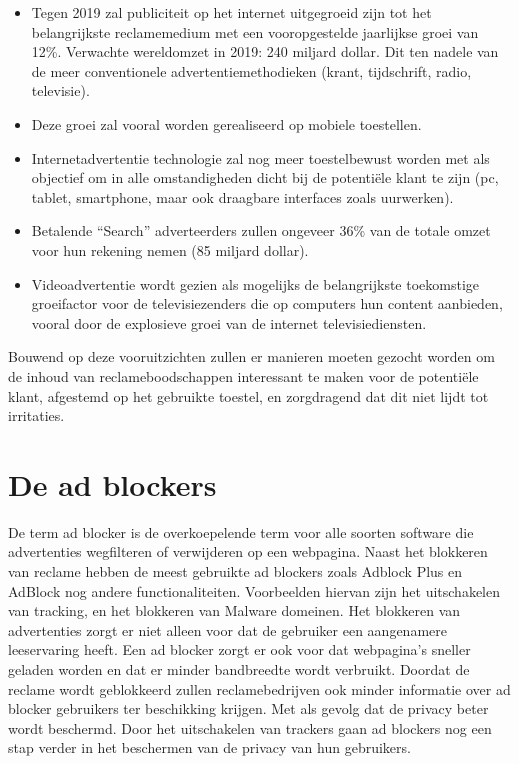 \documentclass[pdftex,a4paper,12pt,twoside]{report}
\begin{document}
\begin{itemize}
	\item 	Tegen 2019 zal publiciteit op het internet uitgegroeid zijn tot het belangrijkste reclamemedium met een vooropgestelde jaarlijkse groei van 12\%. Verwachte wereldomzet in 2019: 240 miljard dollar. Dit ten nadele van de meer conventionele advertentiemethodieken (krant, tijdschrift, radio, televisie).
	
	\item	Deze groei zal vooral worden gerealiseerd op mobiele toestellen.
	\item	Internetadvertentie technologie zal nog meer toestelbewust worden met als objectief om in alle omstandigheden dicht bij de potentiële klant te zijn (pc, tablet, smartphone, maar ook draagbare interfaces zoals uurwerken).
	\item	Betalende “Search” adverteerders zullen ongeveer 36\% van de totale omzet voor hun rekening nemen (85 miljard dollar).
	\item	Videoadvertentie wordt gezien als mogelijks de belangrijkste toekomstige groeifactor voor de televisiezenders die op computers hun content aanbieden, vooral door de explosieve groei van de internet televisiediensten.
\end{itemize}
Bouwend op deze vooruitzichten zullen er manieren moeten gezocht worden om de inhoud van reclameboodschappen interessant te maken voor de potentiële klant, afgestemd op het gebruikte toestel, en zorgdragend dat dit niet lijdt tot irritaties. 

\chapter{De ad blockers}
\label{ch:De Ad blockers}
De term ad blocker is de overkoepelende term voor alle soorten software die advertenties wegfilteren of verwijderen op een webpagina. Naast het blokkeren van reclame hebben de meest gebruikte ad blockers zoals Adblock Plus en AdBlock nog andere functionaliteiten. Voorbeelden hiervan zijn het uitschakelen van tracking, en het blokkeren van Malware domeinen. Het blokkeren van advertenties zorgt er niet alleen voor dat de gebruiker een aangenamere leeservaring heeft. Een ad blocker zorgt er ook voor dat webpagina’s sneller geladen worden en dat er minder bandbreedte wordt verbruikt. Doordat de reclame wordt geblokkeerd zullen reclamebedrijven ook minder informatie over ad blocker gebruikers ter beschikking krijgen. Met als gevolg dat de privacy beter wordt beschermd. Door het uitschakelen van trackers gaan ad blockers nog een stap verder in het beschermen van de privacy van hun gebruikers.
\end{document}
